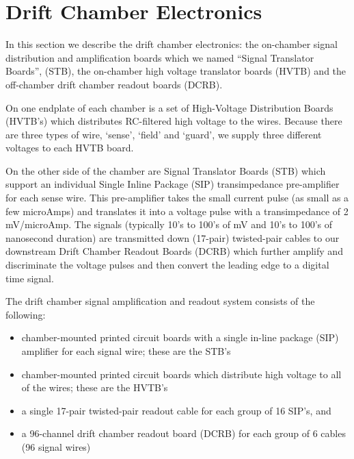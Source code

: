 \section{Drift Chamber Electronics}
In this section we describe the drift chamber electronics:
the on-chamber signal distribution and amplification boards which
we named ``Signal Translator Boards'', (STB),
the on-chamber high voltage translator boards (HVTB) and the
off-chamber drift chamber readout boards (DCRB).

On one endplate of each chamber is a set of High-Voltage Distribution Boards (HVTB's)
which distributes RC-filtered high voltage to the wires.  Because there are three
types of wire, `sense', `field' and `guard', we supply three different voltages
to each HVTB board.  

On the other side of the chamber are Signal Translator Boards (STB) 
which support an individual Single Inline Package (SIP) transimpedance
pre-amplifier for each sense wire.  This pre-amplifier takes the
small current pulse (as small as a few microAmps) and translates it into a voltage 
pulse with a transimpedance of 2 mV/microAmp.  The signals (typically
10's to 100's of mV and 10's to 100's of nanosecond duration) are
transmitted down (17-pair) twisted-pair cables to our downstream
Drift Chamber Readout Boards (DCRB) which further amplify and
discriminate the voltage pulses and then convert the leading edge
to a digital time signal.


The drift chamber signal amplification and readout system consists of the 
following:
\begin{itemize}
\item  chamber-mounted printed circuit boards with a single in-line package
(SIP) amplifier for each signal wire; these are the STB's
\item  chamber-mounted printed circuit boards which distribute high voltage
to all of the wires; these are the HVTB's
\item a single 17-pair twisted-pair readout cable for each group of 16
SIP's, and
\item a 96-channel drift chamber readout board (DCRB) for each group
of 6 cables (96 signal wires)
\end{itemize}

